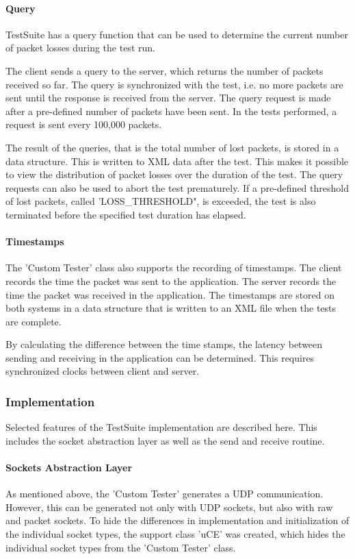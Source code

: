 \paragraph{Query} \label{chap:targetcom:query}
TestSuite has a query function that can be used to determine the current number of packet losses during the test run.

The client sends a query to the server, which returns the number of packets received so far. The query is synchronized with the test, i.e. no more packets are sent until the response is received from the server. The query request is made after a pre-defined number of packets have been sent. In the tests performed, a request is sent every 100,000 packets.

The result of the queries, that is the total number of lost packets, is stored in a data structure. This is written to XML data after the test. This makes it possible to view the distribution of packet losses over the duration of the test. The query requests can also be used to abort the test prematurely. If a pre-defined threshold of lost packets, called 'LOSS\_THRESHOLD", is exceeded, the test is also terminated before the specified test duration has elapsed.

\paragraph{Timestamps}
The 'Custom Tester' class also supports the recording of timestamps. The client records the time the packet was sent to the application. The server records the time the packet was received in the application. The timestamps are stored on both systems in a data structure that is written to an XML file when the tests are complete.

By calculating the difference between the time stamps, the latency between sending and receiving in the application can be determined. This requires synchronized clocks between client and server.

\subsubsection{Implementation}
Selected features of the TestSuite implementation are described here. This includes the socket abstraction layer as well as the send and receive routine.

\paragraph{Sockets Abstraction Layer}
As mentioned above, the 'Custom Tester' generates a UDP communication. However, this can be generated not only with UDP sockets, but also with raw and packet sockets. To hide the differences in implementation and initialization of the individual socket types, the support class 'uCE' was created, which hides the individual socket types from the 'Custom Tester' class.

